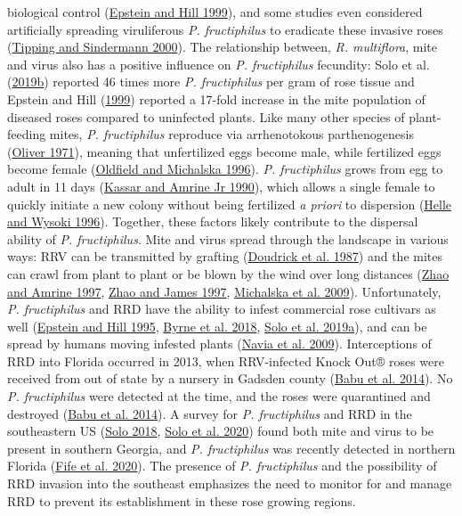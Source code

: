\documentclass{ufdissertation}[overrideChapters] %
\begin{document}
{biological control (\protect\hyperlink{ref-Epstein1999}{Epstein and Hill 1999}), and some studies even considered artificially spreading viruliferous \emph{P. fructiphilus} to eradicate these invasive roses (\protect\hyperlink{ref-Tipping2000}{Tipping and Sindermann 2000}). The relationship between, \emph{R. multiflora}, mite and virus also has a positive influence on \emph{P. fructiphilus} fecundity: Solo et al. (\protect\hyperlink{ref-Solo2019a}{2019b}) reported 46 times more \emph{P. fructiphilus} per gram of rose tissue and Epstein and Hill (\protect\hyperlink{ref-Epstein1999}{1999}) reported a 17-fold increase in the mite population of diseased roses compared to uninfected plants. Like many other species of plant-feeding mites, \emph{P. fructiphilus} reproduce via arrhenotokous parthenogenesis (\protect\hyperlink{ref-Oliver1971}{Oliver 1971}), meaning that unfertilized eggs become male, while fertilized eggs become female (\protect\hyperlink{ref-Oldfield1996b}{Oldfield and Michalska 1996}). \emph{P. fructiphilus} grows from egg to adult in 11 days (\protect\hyperlink{ref-Kassar1990}{Kassar and Amrine Jr 1990}), which allows a single female to quickly initiate a new colony without being fertilized \emph{a priori} to dispersion (\protect\hyperlink{ref-Helle1996}{Helle and Wysoki 1996}). Together, these factors likely contribute to the dispersal ability of \emph{P. fructiphilus}. Mite and virus spread through the landscape in various ways: RRV can be transmitted by grafting (\protect\hyperlink{ref-Doudrick1987}{Doudrick et al. 1987}) and the mites can crawl from plant to plant or be blown by the wind over long distances (\protect\hyperlink{ref-Zhao1997b}{Zhao and Amrine 1997}, \protect\hyperlink{ref-Zhao1997a}{Zhao and James 1997}, \protect\hyperlink{ref-Michalska2009}{Michalska et al. 2009}). Unfortunately, \emph{P. fructiphilus} and RRD have the ability to infest commercial rose cultivars as well (\protect\hyperlink{ref-Epstein1995}{Epstein and Hill 1995}, \protect\hyperlink{ref-Byrne2018}{Byrne et al. 2018}, \protect\hyperlink{ref-Solo2019}{Solo et al. 2019a}), and can be spread by humans moving infested plants (\protect\hyperlink{ref-Navia2009}{Navia et al. 2009}). Interceptions of RRD into Florida occurred in 2013, when RRV-infected Knock Out® roses were received from out of state by a nursery in Gadsden county (\protect\hyperlink{ref-Babu2014}{Babu et al. 2014}). No \emph{P. fructiphilus} were detected at the time, and the roses were quarantined and destroyed (\protect\hyperlink{ref-Babu2014}{Babu et al. 2014}). A survey for \emph{P. fructiphilus} and RRD in the southeastern US (\protect\hyperlink{ref-Solo2018}{Solo 2018}, \protect\hyperlink{ref-Solo2020}{Solo et al. 2020}) found both mite and virus to be present in southern Georgia, and \emph{P. fructiphilus} was recently detected in northern Florida (\protect\hyperlink{ref-Fife2020}{Fife et al. 2020}). The presence of \emph{P. fructiphilus} and the possibility of RRD invasion into the southeast emphasizes the need to monitor for and manage RRD to prevent its establishment in these rose growing regions.
\begin{figure}


\end{figure}}
\end{document}
